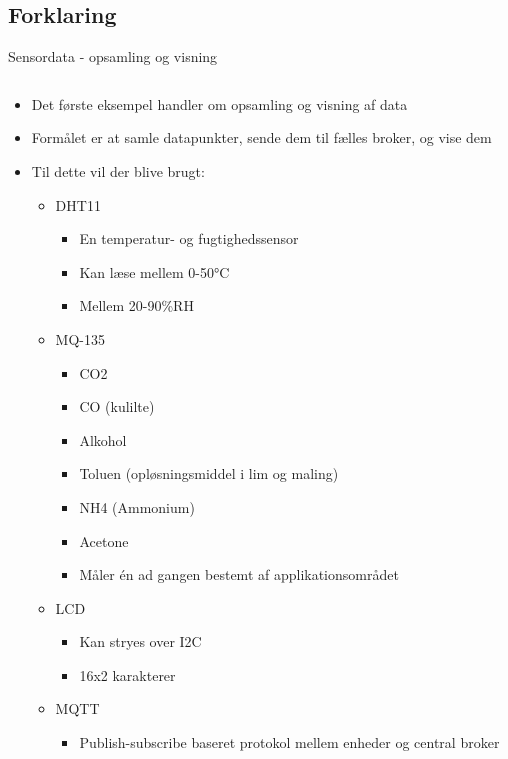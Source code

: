 \documentclass[aspectratio=169]{beamer}
\begin{document}
\subsection{Forklaring}
\begin{frame}{Sensordata - opsamling og visning}
\begin{columns}
	\begin{column}{0.6\textwidth}
		\begin{textBox}
			\begin{itemize}
				\item Det første eksempel handler om opsamling og visning af data
				\item Formålet er at samle datapunkter, sende dem til fælles broker, og vise dem
				\item Til dette vil der blive brugt:
				\begin{itemize}
					\item DHT11
					\begin{itemize}
						\item En temperatur- og fugtighedssensor
						\item Kan læse mellem 0-50°C
						\item Mellem 20-90\%RH
					\end{itemize}
					\item MQ-135
					\begin{itemize}
							\item CO2
							\item CO (kulilte)
							\item Alkohol
							\item Toluen (opløsningsmiddel i lim og maling)
							\item NH4 (Ammonium)
							\item Acetone
						\item Måler én ad gangen bestemt af applikationsområdet
					\end{itemize}
					\item LCD
					\begin{itemize}
						\item Kan stryes over I2C
						\item 16x2 karakterer
					\end{itemize}
					\item MQTT 
					\begin{itemize}
						\item Publish-subscribe baseret protokol mellem enheder og central broker

\end{itemize}
\end{itemize}
\end{itemize}
\end{textBox}
\end{column}
\end{columns}
\end{frame}
\end{document}
